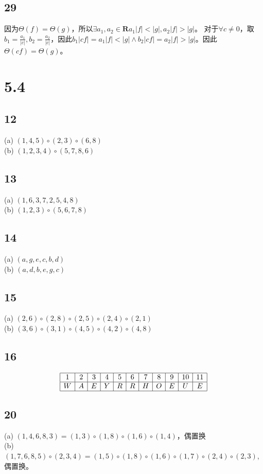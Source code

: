 \documentclass{article}
\begin{document}
\subsection{29}
因为$\Theta(f) = \Theta(g)$，所以$\exists a_1, a_2 \in \mathbf{R} a_1|f| < |g|, a_2|f| > |g|$。
对于$\forall c \neq 0$，取$b_1 = \frac{a_1}{|c|}, b_2 = \frac{a_2}{|c|}$，因此$b_1|cf| = a_1|f| < |g| \land
b_2|cf| = a_2|f| > |g|$。因此$\Theta(cf) = \Theta(g)$。
\section{5.4}
\subsection{12}
(a) $(1, 4, 5) \circ (2, 3) \circ (6, 8)$\\
(b) $(1, 2, 3, 4) \circ (5, 7, 8, 6)$
\subsection{13}
(a) $(1, 6, 3, 7, 2, 5, 4, 8)$\\
(b) $(1, 2, 3) \circ (5, 6, 7, 8)$
\subsection{14}
(a) $(a, g, e, c, b, d)$\\
(b) $(a, d, b, e, g, c)$\\
\subsection{15}
(a) $(2, 6) \circ (2, 8) \circ (2, 5) \circ (2, 4) \circ (2, 1)$\\
(b) $(3, 6) \circ (3, 1) \circ (4, 5) \circ (4, 2) \circ (4, 8)$
\subsection{16}
$$
\begin{array}{|c|c|c|c|c|c|c|c|c|c|c|}
    \hline
    1 & 2 & 3 & 4 & 5 & 6 & 7 & 8 & 9 & 10 & 11\\
    \hline
    W & A & E & Y & R & R & H & O & E & U & E\\
    \hline
\end{array}
$$
\subsection{20}
(a) $(1, 4, 6, 8, 3) = (1, 3) \circ (1, 8) \circ (1, 6) \circ (1, 4)$，偶置换\\
(b) $(1, 7, 6, 8, 5) \circ (2, 3, 4) = (1, 5) \circ (1, 8) \circ (1, 6) \circ (1, 7) \circ (2, 4) \circ (2, 3)$,偶置换。 
\end{document}
